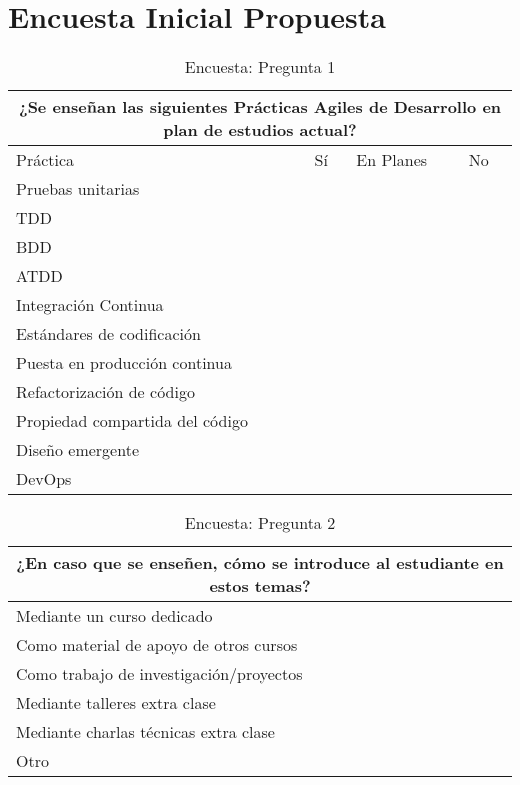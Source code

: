  \label{sec:apendice-1}
\section*{Encuesta Inicial Propuesta} 

\begin{table}[h!]
\begin{tabular}{ |p{11cm}||p{1cm}|p{2cm}|p{1cm}| }
 \toprule[1.5pt]
 \multicolumn{4}{|c|}{\textbf{¿Se enseñan las siguientes Prácticas Agiles de Desarrollo en plan de estudios actual?}} \\
\toprule[1.5pt]
Práctica & Sí & En Planes & No \\
\toprule[1.5pt]
    Pruebas unitarias & & & \\
    \hline
    TDD & & & \\
    \hline
    BDD & & & \\
    \hline
    ATDD & & & \\
    \hline
    Integración Continua & & & \\
    \hline
    Estándares de codificación & & & \\
    \hline
    Puesta en producción continua & & & \\
    \hline
    Refactorización de código & & & \\
    \hline
    Propiedad compartida del código & & & \\
    \hline
    Diseño emergente & & & \\ 
    \hline
    DevOps & & & \\
 \hline       
\end{tabular}
    \caption{Encuesta: Pregunta 1}
\end{table}

\begin{table}[h!]
\begin{tabular}{ |p{12cm}||p{2cm}| }
 \toprule[1.5pt]
 \multicolumn{2}{|c|}{\textbf{¿En caso que se enseñen, cómo se introduce al estudiante en estos temas?}} \\
\toprule[1.5pt]
    Mediante un curso dedicado & \\
    \hline
    Como material de apoyo de otros cursos &  \\
    \hline
    Como trabajo de investigación/proyectos & \\
    \hline
    Mediante talleres extra clase & \\
    \hline
    Mediante charlas técnicas extra clase & \\
    \hline
    Otro & \\
 \hline       
\end{tabular}
    \caption{Encuesta: Pregunta 2}
\end{table}

